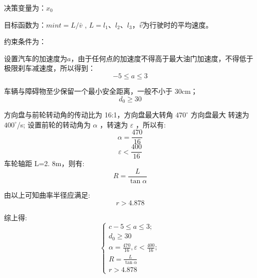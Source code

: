 \documentclass{article}
\begin{document}
决策变量为：$x_0$

目标函数为：$mint=L/\bar{v}$ , $L=l_1$、$l_2$、$l_3$，$\bar{v}$̅为行驶时的平均速度。

约束条件为：

设置汽车的加速度为$a$，由于任何点的加速度不得高于最大油门加速度，不得低于极限刹车减速度，所以得到：
\begin{equation}
    -5 \leq a \leq 3
\end{equation}

车辆与障碍物至少保留一个最小安全距离，一般不小于 30cm；
\begin{equation}
    d_0 \geq  30
\end{equation}

方向盘与前轮转动角的传动比为 16:1，方向盘最大转角 $470^{\circ}$ 方向盘最大
转速为 $400^{\circ}$/s; 设置前轮的转动角为 $\alpha$ ，转速为 $\varepsilon$ ，所以有:
\begin{equation}
    \alpha  =\frac{470}{16}
\end{equation}
\begin{equation}
    \varepsilon  <\frac{400}{16}
\end{equation}
车轮轴距 L=2. 8m，则有:
\begin{equation}
    R=\frac{L}{\tan \alpha}
\end{equation}

由以上可知曲率半径应满足:
\begin{equation}
    r>4.878
\end{equation}

综上得:
\begin{equation*}
    \left\{\begin{aligned}{c}
        -5 \leqslant a \leqslant 3 ;                        \\
        d_{0} \geq 30                                       \\
        \alpha=\frac{470}{16}, \varepsilon<\frac{400}{16} ; \\
        R=\frac{L}{\tan \alpha}                             \\
        r>4.878
    \end{aligned}\right.
\end{equation*}
\end{document}
